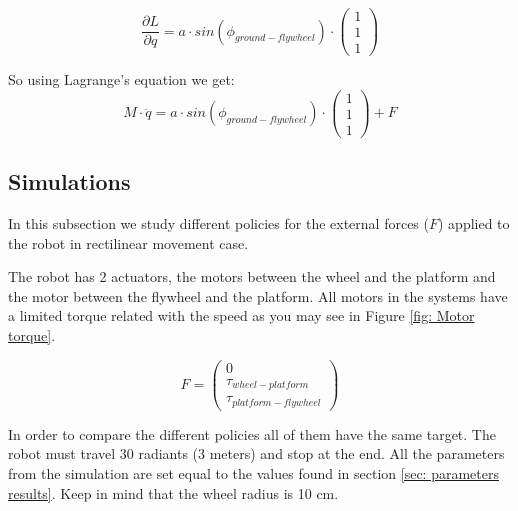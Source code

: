 \begin{equation}
	\frac{\partial L}{\partial q} = a \cdot sin(\phi_{ground-flywheel}) \cdot
	\begin{pmatrix}
		1 \\ 1 \\ 1
	\end{pmatrix}
\end{equation}

So using Lagrange's equation we get:
\begin{equation}
	\boxed{
		M \cdot \ddot{q} = a \cdot sin(\phi_{ground-flywheel}) \cdot
		\begin{pmatrix}
			1 \\ 1 \\ 1
		\end{pmatrix} + F
	}
\end{equation}


\subsection{Simulations}
In this subsection we study different policies for the external forces
($F$) applied to the robot in rectilinear movement case.

The robot has 2 actuators, the motors between the wheel and the platform
and the motor between the flywheel and the platform.
All motors in the systems  have a limited torque related with the
speed as you may see in Figure \ref{fig: Motor torque}.

\begin{equation}
	\boxed{
		F =
		\begin{pmatrix}
			0 \\ \tau_{wheel-platform} \\ \tau_{platform-flywheel}
		\end{pmatrix}
	}
\end{equation}

In order to compare the different policies all of them have the same target.
The robot must travel 30 radiants (3 meters) and stop at the end. All the parameters from 
the simulation are set equal to the values found in section \ref{sec: parameters results}.
Keep in mind that the wheel radius is 10 cm.

